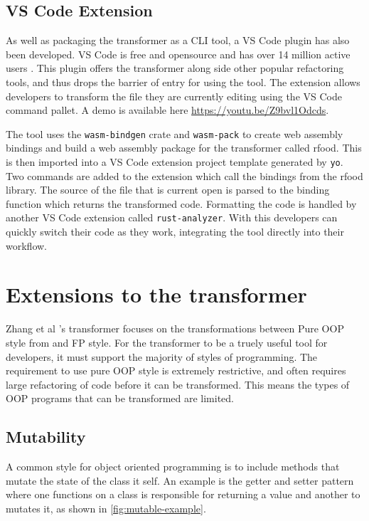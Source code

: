 \documentclass[ oneside,%
                    author={James Elgar},
                    degree={MEng},
                     title={Bidirectional transformer between functional and \\ object-oriented programming in Rust},
                  subtitle={}]{dissertation}
\newcommand{\weixin}{Zhang et al }
\begin{document}
\subsection{VS Code Extension}

As well as packaging the transformer as a CLI tool, a VS Code plugin has also been developed. VS Code is free and opensource and has over 14 million active users \cite{tung_2021}. This plugin offers the transformer along side other popular refactoring tools, and thus drops the barrier of entry for using the tool. The extension allows developers to transform the file they are currently editing using the VS Code command pallet. A demo is available here \url{https://youtu.be/Z9bvl1Odcds}.

The tool uses the \verb|wasm-bindgen| crate and \verb|wasm-pack| to create web assembly bindings and build a web assembly package for the transformer called rfood. This is then imported into a VS Code extension project template generated by \verb|yo|. Two commands are added to the extension which call the bindings from the rfood library. The source of the file that is current open is parsed to the binding function which returns the transformed code. Formatting the code is handled by another VS Code extension called \verb|rust-analyzer|. With this developers can quickly switch their code as they work, integrating the tool directly into their workflow.

\section{Extensions to the transformer}

\weixin's transformer focuses on the transformations between Pure OOP style from \cite{cook} and FP style. For the transformer to be a truely useful tool for developers, it must support the majority of styles of programming. 
The requirement to use pure OOP style is extremely restrictive, and often requires large refactoring of code before it can be transformed.
This means the types of OOP programs that can be transformed are limited.

\subsection{Mutability}

A common style for object oriented programming is to include methods that mutate the state of the class it self. An example is the getter and setter pattern where one functions on a class is responsible for returning a value and another to mutates it, as shown in \autoref{fig:mutable-example}.
\end{document}
